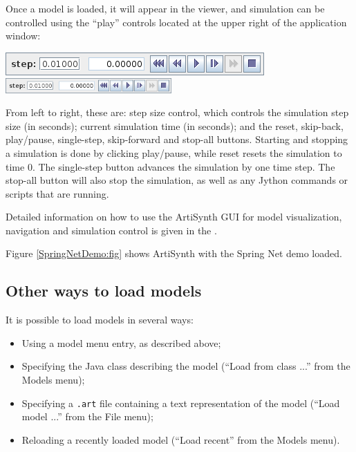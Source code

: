 Once a model is loaded, it will appear in the viewer, and simulation
can be controlled using the ``play'' controls located at the upper right
of the application window:

\begin{center}
\iflatexml
  \includegraphics[]{../uiguide/images/playControls}
\else
  \includegraphics[width=2.5in]{../uiguide/images/playControls}
\fi
\end{center}

From left to right, these are: step size control, which controls the
simulation step size (in seconds); current simulation time (in
seconds); and the {\sf reset}, {\sf skip-back}, {\sf play/pause}, {\sf
single-step}, {\sf skip-forward} and {\sf stop-all} buttons.  Starting
and stopping a simulation is done by clicking {\sf play/pause}, while
{\sf reset} resets the simulation to time 0.  The {\sf single-step}
button advances the simulation by one time step. The {\sf stop-all}
button will also stop the simulation, as well as any Jython commands
or scripts that are running.

Detailed information on how to use the ArtiSynth GUI for model
visualization, navigation and simulation control is given in the
.

Figure \ref{SpringNetDemo:fig} shows ArtiSynth with the {\sf Spring
Net} demo loaded.

\subsection{Other ways to load models}

It is possible to load models in several ways:

\begin{itemize}

\item Using a model menu entry, as described above;

\item Specifying the Java class describing the model
({\sf ``Load from class ...''} from the {\sf Models} menu);

\item Specifying a {\tt .art} file containing a text
representation of the model ({\sf ``Load model ...''} from the {\sf
File} menu);

\item Reloading a recently loaded model 
({\sf ``Load recent''} from the {\sf Models} menu).

\end{itemize}

